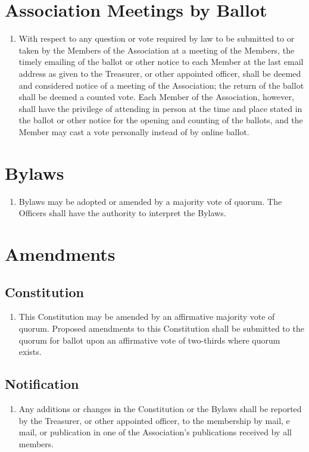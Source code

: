 \documentclass[12pt,letterpaper]{article}
\begin{document}
\section{Association Meetings by Ballot}
\begin{enumerate}
  \item With respect to any question or vote required by law to be submitted to or
        taken by the Members of the Association at a meeting of the Members, the
        timely emailing of the ballot or other notice to each Member at the last
        email address as given to the Treasurer, or other appointed officer, shall be
        deemed and considered notice of a meeting of the Association; the return of
        the ballot shall be deemed a counted vote. Each Member of the Association,
        however, shall have the privilege of attending in person at the time and
        place stated in the ballot or other notice for the opening and counting of
        the ballots, and the Member may cast a vote personally instead of by online
        ballot.
\end{enumerate}

\section{Bylaws}
\begin{enumerate}
  \item Bylaws may be adopted or amended by a majority vote of quorum. The Officers
        shall have the authority to interpret the Bylaws.
\end{enumerate}

\section{Amendments}

\subsection{Constitution}
\begin{enumerate}
  \item This Constitution may be amended by an affirmative majority vote of quorum.
        Proposed amendments to this Constitution shall be submitted to the quorum for
        ballot upon an affirmative vote of two-thirds where quorum exists.
\end{enumerate}

\subsection{Notification}
\begin{enumerate}
  \item Any additions or changes in the Constitution or the Bylaws shall be reported
        by the Treasurer, or other appointed officer, to the membership by mail, e
        mail, or publication in one of the Association's publications received by all
        members.
\end{enumerate}
\end{document}
